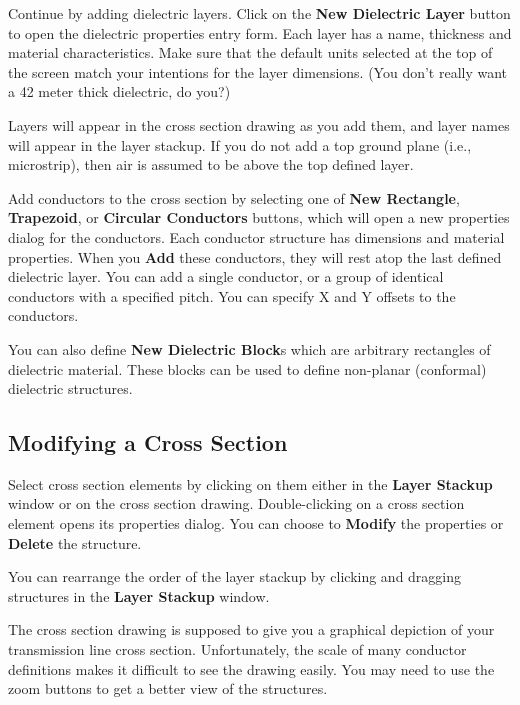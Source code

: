 \documentclass{article}
\begin{document}
Continue by adding dielectric layers.  Click on the {\bf New
Dielectric Layer} button to open the dielectric properties entry form.
Each layer has a name, thickness and material characteristics.  Make
sure that the default units selected at the top of the screen match
your intentions for the layer dimensions.  (You don't really want a 42
meter thick dielectric, do you?)

Layers will appear in the cross section drawing as you add them, and
layer names will appear in the layer stackup.  If you do not add a top
ground plane (i.e., microstrip), then air is assumed to be above the
top defined layer.

Add conductors to the cross section by selecting one of {\bf New
Rectangle}, {\bf Trapezoid}, or {\bf Circular Conductors} buttons,
which will open a new properties dialog for the conductors.  Each
conductor structure has dimensions and material properties.  When you
{\bf Add} these conductors, they will rest atop the last defined
dielectric layer.  You can add a single conductor, or a group of
identical conductors with a specified pitch.  You can specify X and Y
offsets to the conductors.

You can also define {\bf New Dielectric Block}s which are arbitrary 
rectangles of dielectric material.  These blocks can be used to define
non-planar (conformal) dielectric structures.



\subsection {Modifying a Cross Section} \label{sec:modify}

Select cross section elements by clicking on them either in the {\bf
Layer Stackup} window or on the cross section drawing.
Double-clicking on a cross section element opens its properties
dialog.  You can choose to {\bf Modify} the properties or {\bf Delete}
the structure.

You can rearrange the order of the layer stackup by clicking and
dragging structures in the {\bf Layer Stackup} window.

The cross section drawing is supposed to give you a graphical
depiction of your transmission line cross section.  Unfortunately, the
scale of many conductor definitions makes it difficult to see the
drawing easily.  You may need to use the zoom buttons to get a better
view of the structures.
\end{document}
